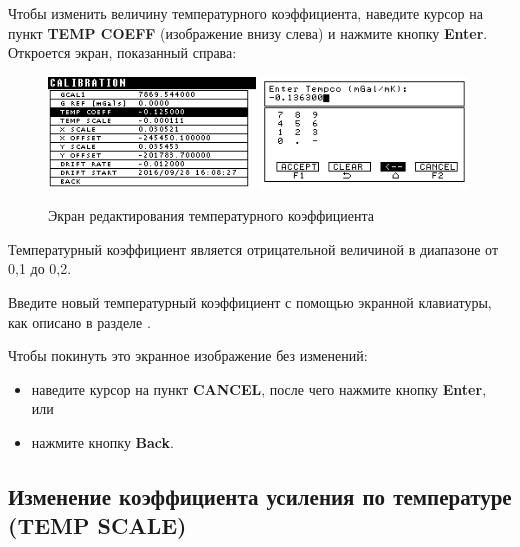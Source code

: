 Чтобы изменить величину температурного коэффициента, наведите курсор на пункт
\textbf{TEMP COEFF} (изображение внизу слева) и нажмите кнопку \textbf{Enter}.
Откроется экран, показанный справа:

\begin{figure}[H]
  \centering
  \includegraphics[width=0.49\textwidth]{figures/the_temperature_coefficient_editing_screen_1}
  \includegraphics[width=0.49\textwidth]{figures/the_temperature_coefficient_editing_screen_2}
  \caption{Экран редактирования температурного коэффициента}
  \label{fig:the_temperature_coefficient_editing_screen}
\end{figure}

Температурный коэффициент является отрицательной величиной в диапазоне от
\textminus{}0,1 до \textminus{}0,2.

Введите новый температурный коэффициент с помощью экранной клавиатуры, как
описано в разделе .

Чтобы покинуть это экранное изображение без изменений:
\begin{itemize}
  \item наведите курсор на пункт \textbf{CANCEL}, после чего нажмите кнопку
    \textbf{Enter}, или

  \item нажмите кнопку \textbf{Back}.
\end{itemize}

\subsection[Изменение коэффициента усиления по температуре]{Изменение коэффициента усиления по температуре (TEMP SCALE)}


